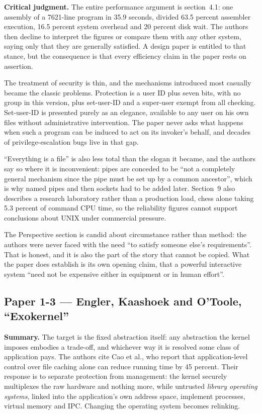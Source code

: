 \textbf{Critical judgment.}
The entire performance argument is section~4.1: one assembly of a 7621-line program in
35.9 seconds, divided 63.5 percent assembler execution, 16.5 percent system overhead and
20 percent disk wait. The authors then decline to interpret the figures or compare them
with any other system, saying only that they are generally satisfied. A design paper is
entitled to that stance, but the consequence is that every efficiency claim in the paper
rests on assertion.

The treatment of security is thin, and the mechanisms introduced most casually became the
classic problems. Protection is a user ID plus seven bits, with no group in this version,
plus set-user-ID and a super-user exempt from all checking. Set-user-ID is presented
purely as an elegance, available to any user on his own files without administrative
intervention. The paper never asks what happens when such a program can be induced to act
on its invoker's behalf, and decades of privilege-escalation bugs live in that gap.

``Everything is a file'' is also less total than the slogan it became, and the authors say
so where it is inconvenient: pipes are conceded to be ``not a completely general mechanism
since the pipe must be set up by a common ancestor'', which is why named pipes and then
sockets had to be added later. Section~9 also describes a research laboratory rather than
a production load, chess alone taking 5.3 percent of command CPU time, so the reliability
figures cannot support conclusions about UNIX under commercial pressure.

The Perspective section is candid about circumstance rather than method: the authors were
never faced with the need ``to satisfy someone else's requirements''. That is honest, and
it is also the part of the story that cannot be copied. What the paper does establish is
its own opening claim, that a powerful interactive system ``need not be expensive either
in equipment or in human effort''.

\subsection*{Paper 1-3 --- Engler, Kaashoek and O'Toole, ``Exokernel''}
\label{p3:sec:exokernel}

\textbf{Summary.}
The target is the fixed abstraction itself: any abstraction the kernel imposes embodies a
trade-off, and whichever way it is resolved some class of application pays. The authors
cite Cao et al., who report that application-level control over file caching alone can
reduce running time by 45 percent. Their response is to separate protection from
management: the kernel securely multiplexes the raw hardware and nothing more, while
untrusted \emph{library operating systems}, linked into the application's own address
space, implement processes, virtual memory and IPC. Changing the operating system becomes
relinking.

